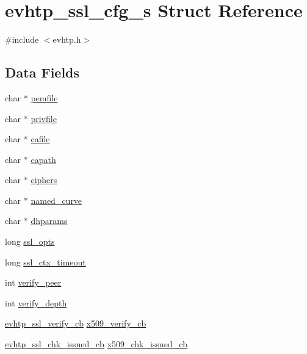 \hypertarget{structevhtp__ssl__cfg__s}{\section{evhtp\-\_\-ssl\-\_\-cfg\-\_\-s Struct Reference}
\label{structevhtp__ssl__cfg__s}
}


{\ttfamily \#include $<$evhtp.\-h$>$}

\subsection*{Data Fields}
\begin{DoxyCompactItemize}
\item 
char $\ast$ \hyperlink{structevhtp__ssl__cfg__s_a166ccef38a88683b0b0896eecb4994e1}{pemfile}
\item 
char $\ast$ \hyperlink{structevhtp__ssl__cfg__s_a316b5f5b982f40f1492e9b732af977f4}{privfile}
\item 
char $\ast$ \hyperlink{structevhtp__ssl__cfg__s_a9ff8d56644bac1d41f8039f2fde5acf2}{cafile}
\item 
char $\ast$ \hyperlink{structevhtp__ssl__cfg__s_a8331a8443119478cd6b1daeb707a94dc}{capath}
\item 
char $\ast$ \hyperlink{structevhtp__ssl__cfg__s_a3e4edb91e89d3cffda8059a32d60e0e8}{ciphers}
\item 
char $\ast$ \hyperlink{structevhtp__ssl__cfg__s_a4f6c3b50f60ca2a30cfa2d6ce71950b6}{named\-\_\-curve}
\item 
char $\ast$ \hyperlink{structevhtp__ssl__cfg__s_ab62d5f6ab6c588676abce7410db0a178}{dhparams}
\item 
long \hyperlink{structevhtp__ssl__cfg__s_a1132f6a904a8decf77db2cbf4ff14d75}{ssl\-\_\-opts}
\item 
long \hyperlink{structevhtp__ssl__cfg__s_a13019a5b9cc55530a286c6a2d398e49a}{ssl\-\_\-ctx\-\_\-timeout}
\item 
int \hyperlink{structevhtp__ssl__cfg__s_ae9286c319acb85537c44e2eb86bf546e}{verify\-\_\-peer}
\item 
int \hyperlink{structevhtp__ssl__cfg__s_af960941c08b45889252b28b3dac628c7}{verify\-\_\-depth}
\item 
\hyperlink{evhtp_8h_a8aadad99ab39bbee051fd42101573ca4}{evhtp\-\_\-ssl\-\_\-verify\-\_\-cb} \hyperlink{structevhtp__ssl__cfg__s_afcc514daa3570553ab171826205601c6}{x509\-\_\-verify\-\_\-cb}
\item 
\hyperlink{evhtp_8h_a788e6ae6e8d552210479fd0d51c89223}{evhtp\-\_\-ssl\-\_\-chk\-\_\-issued\-\_\-cb} \hyperlink{structevhtp__ssl__cfg__s_a886c9bdf3d0ff43ec0ddca4eec2038bf}{x509\-\_\-chk\-\_\-issued\-\_\-cb}

\end{DoxyCompactItemize}
